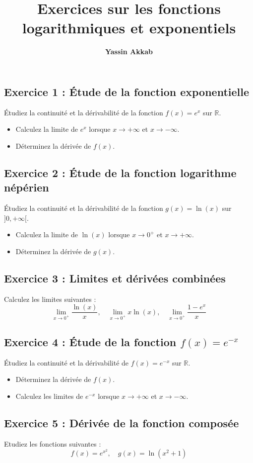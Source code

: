 \documentclass{article}
\title{\textbf{Exercices sur les fonctions logarithmiques et exponentiels}}
\author{\textbf{Yassin Akkab}}
\begin{document}
	
	\maketitle
	
	\subsection*{Exercice 1 : Étude de la fonction exponentielle}
	Étudiez la continuité et la dérivabilité de la fonction \( f(x) = e^x \) sur \( \mathbb{R} \).
	\begin{itemize}
	
		\item Calculez la limite de \( e^x \) lorsque \( x \to +\infty \) et \( x \to -\infty \).
			\item Déterminez la dérivée de \( f(x) \).
	\end{itemize}
	
	\subsection*{Exercice 2 : Étude de la fonction logarithme népérien}
	Étudiez la continuité et la dérivabilité de la fonction \( g(x) = \ln(x) \) sur \( ]0, +\infty[ \).
	\begin{itemize}
	
		\item Calculez la limite de \( \ln(x) \) lorsque \( x \to 0^+ \) et \( x \to +\infty \).
			\item Déterminez la dérivée de \( g(x) \).
	\end{itemize}
	
	\subsection*{Exercice 3 : Limites et dérivées combinées}
	Calculez les limites suivantes :
	\[
	\lim_{x \to 0^+} \frac{\ln(x)}{x}, \quad \lim_{x \to 0^+} x \ln(x), \quad \lim_{x \to 0^+} \frac{1 - e^x}{x}
	\]
	

	
	\subsection*{Exercice 4 : Étude de la fonction \( f(x) = e^{-x} \)}
	Étudiez la continuité et la dérivabilité de \( f(x) = e^{-x} \) sur \( \mathbb{R} \).
	\begin{itemize}
		\item Déterminez la dérivée de \( f(x) \).
		\item Calculez les limites de \( e^{-x} \) lorsque \( x \to +\infty \) et \( x \to -\infty \).
	\end{itemize}
	
	\subsection*{Exercice 5 : Dérivée de la fonction composée}
		Etudiez les fonctions suivantes : 
	\[
	f(x) = e^{x^2}, \quad g(x) = \ln(x^2 + 1)
	\]

	
	
	
	
	
	
	
	
	
	
	
	
\end{document}
